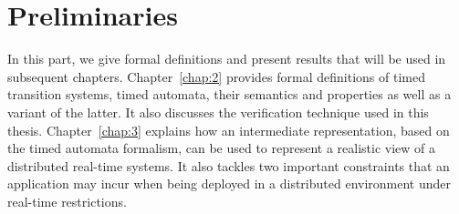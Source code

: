 \documentclass[a4paper,Times,twoside,index,12pt]{Classes/PhDThesisPSnPDF}
\begin{document}
\frontmatter




\begin{titlepage}
  \maketitle
\end{titlepage}

\mainmatter

%
%




\dominitoc
\dominilof
\dominilot
\renewcommand{\baselinestretch}{0.9}\normalsize
\tableofcontents
\renewcommand{\baselinestretch}{1.0}\normalsize





\part{Preliminaries}
{In this part, we give formal definitions and present results that will be used in subsequent
chapters. Chapter~\ref{chap:2} provides formal definitions of timed transition systems,
timed automata, their semantics and properties as well as a variant of the latter.
It also discusses the verification technique used in this thesis. Chapter~\ref{chap:3}
explains how an intermediate representation, based on the timed automata formalism,
can be used to represent a realistic view of a distributed real-time systems. It also tackles
two important constraints that an application may incur when being deployed in a distributed
environment under real-time restrictions.} 


\end{document}
